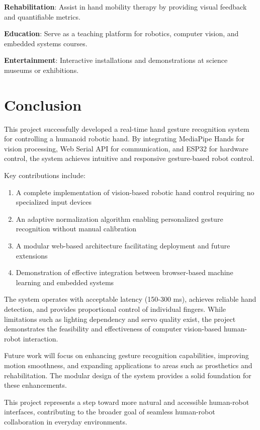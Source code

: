 \documentclass[12pt]{article}
\begin{document}
\textbf{Rehabilitation}: Assist in hand mobility therapy by providing visual feedback and quantifiable metrics.

\textbf{Education}: Serve as a teaching platform for robotics, computer vision, and embedded systems courses.

\textbf{Entertainment}: Interactive installations and demonstrations at science museums or exhibitions.

\section{Conclusion}

This project successfully developed a real-time hand gesture recognition system for controlling a humanoid robotic hand. By integrating MediaPipe Hands for vision processing, Web Serial API for communication, and ESP32 for hardware control, the system achieves intuitive and responsive gesture-based robot control.

Key contributions include:
\begin{enumerate}
    \item A complete implementation of vision-based robotic hand control requiring no specialized input devices
    \item An adaptive normalization algorithm enabling personalized gesture recognition without manual calibration
    \item A modular web-based architecture facilitating deployment and future extensions
    \item Demonstration of effective integration between browser-based machine learning and embedded systems
\end{enumerate}

The system operates with acceptable latency (150-300 ms), achieves reliable hand detection, and provides proportional control of individual fingers. While limitations such as lighting dependency and servo quality exist, the project demonstrates the feasibility and effectiveness of computer vision-based human-robot interaction.

Future work will focus on enhancing gesture recognition capabilities, improving motion smoothness, and expanding applications to areas such as prosthetics and rehabilitation. The modular design of the system provides a solid foundation for these enhancements.

This project represents a step toward more natural and accessible human-robot interfaces, contributing to the broader goal of seamless human-robot collaboration in everyday environments.
\end{document}

